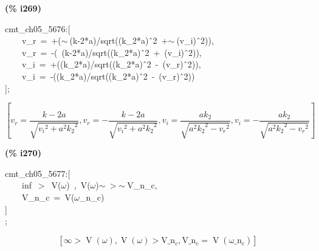\documentclass[fleqn]{article}
\begin{document}
\noindent
\begin{minipage}[t]{4.000000em}\color{red}\bfseries
(\% i269)	
\end{minipage}
\begin{minipage}[t]{\textwidth}\color{blue}
cmt\_ch05\_5676:[\\
\ \ \ \ v\_r\ =\ +(\ensuremath{\sim\ }(k-2*a)/sqrt((k\_2*a)\^\ 2\ +\ensuremath{\sim\ }(v\_i)\^\ 2)),\\
\ \ \ \ v\_r\ =\ -(\ (k-2*a)/sqrt((k\_2*a)\^\ 2\ +\ (v\_i)\^\ 2)),\\
\ \ \ \ v\_i\ =\ +((k\_2*a)/sqrt((k\_2*a)\^\ 2\ -\ (v\_r)\^\ 2)),\\
\ \ \ \ v\_i\ =\ -((k\_2*a)/sqrt((k\_2*a)\^\ 2\ -\ (v\_r)\^\ 2))\\
];
\end{minipage}
\[\displaystyle \tag{\% o269} 
\left[ {v_r}=\frac{k-2 a}{\sqrt{{{{v_i}}^{2}}+{{a}^{2}} {{{k_2}}^{2}}}}\operatorname{,}{v_r}=-\frac{k-2 a}{\sqrt{{{{v_i}}^{2}}+{{a}^{2}} {{{k_2}}^{2}}}}\operatorname{,}{v_i}=\frac{a {k_2}}{\sqrt{{{a}^{2}} {{{k_2}}^{2}}-{{{v_r}}^{2}}}}\operatorname{,}{v_i}=-\frac{a {k_2}}{\sqrt{{{a}^{2}} {{{k_2}}^{2}}-{{{v_r}}^{2}}}}\right] \mbox{}
\]


\noindent
\begin{minipage}[t]{4.000000em}\color{red}\bfseries
(\% i270)	
\end{minipage}
\begin{minipage}[t]{\textwidth}\color{blue}
cmt\_ch05\_5677:[\\
\ \ \ \ inf\ \ensuremath{>}\ V(\ensuremath{\omega})\ ,\ V(\ensuremath{\omega})\ensuremath{\sim\ }\ensuremath{>}\ensuremath{\sim\ }V\_n\_c,\\
\ \ \ \ V\_n\_c\ =\ V(\ensuremath{\omega}\_n\_c)\\
]\\
;
\end{minipage}
\[\displaystyle \tag{\% o270} 
\left[ \infty \operatorname{>  }\operatorname{V}\left( \omega \right) \operatorname{,}\operatorname{V}\left( \omega \right) \operatorname{>  }{{\ensuremath{\mathrm{V\_ n}}}_c}\operatorname{,}{{\ensuremath{\mathrm{V\_ n}}}_c}=\operatorname{V}\left( {{\ensuremath{\mathrm{\omega \_ n}}}_c}\right) \right] \mbox{}
\]
\end{document}
